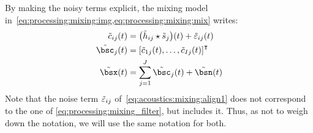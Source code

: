 \mynewline
By making the noisy terms explicit, the mixing model in~\cref{eq:processing:mixing:img,eq:processing:mixing:mix} writes:
\begin{align}\label{eq:acoustics:mixing:align1}
    \tilde{\img}_{\idxMicSrc}(t) &=  \kparen{\tilde{\rir}_{\idxMicSrc} \convCont \tilde{\src}_\idxSrc} (t) +  \tilde{\varepsilon}_{\idxMicSrc}(t)\\
    \tilde{\imgs}_\idxSrc(t)         &= \ktranspose{\klist{\tilde{\img}_{1\idxSrc}(t), \dots, \tilde{\img}_{\numMics\idxSrc}(t)}} \nonumber\\
    \tilde{\mics}(t)                 &= \sum_{\idxSrc=1}^{\numSrcs} \tilde{\imgs}_\idxSrc(t) + \tilde{\bsn}( t)
\end{align}
Note that the noise term $\tilde{\varepsilon}_{ij}$ of~\cref{eq:acoustics:mixing:align1} does not correspond to the one of \cref{eq:processing:mixing_filter}, but includes it.
Thus, as not to weigh down the notation, we will use the same notation for both.

